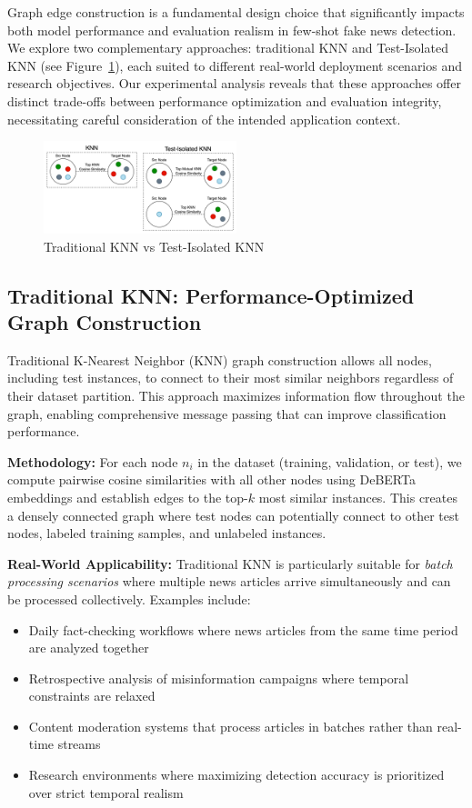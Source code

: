 Graph edge construction is a fundamental design choice that significantly impacts both model performance and evaluation realism in few-shot fake news detection. We explore two complementary approaches: traditional KNN and Test-Isolated KNN (see Figure~\ref{fig:edge_construction}), each suited to different real-world deployment scenarios and research objectives. Our experimental analysis reveals that these approaches offer distinct trade-offs between performance optimization and evaluation integrity, necessitating careful consideration of the intended application context.

\begin{figure}[h]
    \centering
    \includegraphics[width=0.5\textwidth]{context/methodology/fig/edge_construction.png}
    \caption{Traditional KNN vs Test-Isolated KNN}
    \label{fig:edge_construction}
\end{figure}

\subsection{Traditional KNN: Performance-Optimized Graph Construction}

Traditional K-Nearest Neighbor (KNN) graph construction allows all nodes, including test instances, to connect to their most similar neighbors regardless of their dataset partition. This approach maximizes information flow throughout the graph, enabling comprehensive message passing that can improve classification performance.

\textbf{Methodology:} For each node $n_i$ in the dataset (training, validation, or test), we compute pairwise cosine similarities with all other nodes using DeBERTa embeddings and establish edges to the top-$k$ most similar instances. This creates a densely connected graph where test nodes can potentially connect to other test nodes, labeled training samples, and unlabeled instances.

\textbf{Real-World Applicability:} Traditional KNN is particularly suitable for \emph{batch processing scenarios} where multiple news articles arrive simultaneously and can be processed collectively. Examples include:
\begin{itemize}
    \item Daily fact-checking workflows where news articles from the same time period are analyzed together
    \item Retrospective analysis of misinformation campaigns where temporal constraints are relaxed
    \item Content moderation systems that process articles in batches rather than real-time streams
    \item Research environments where maximizing detection accuracy is prioritized over strict temporal realism
\end{itemize}

